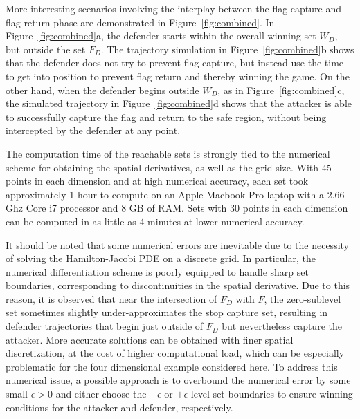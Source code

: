 \documentclass[letterpaper, 10 pt, conference]{ieeeconf}  %
\numberwithin{algorithm}{section}
\begin{document}
More interesting scenarios involving the interplay between the flag capture and flag return phase are demonstrated in Figure~\ref{fig:combined}.  In Figure~\ref{fig:combined}a, the defender starts within the overall winning set $W_D$, but outside the set $F_D$.  The trajectory simulation in Figure~\ref{fig:combined}b shows that the defender does not try to prevent flag capture, but instead use the time to get into position to prevent flag return and thereby winning the game.  On the other hand, when the defender begins outside $W_D$, as in Figure~\ref{fig:combined}c, the simulated trajectory in Figure~\ref{fig:combined}d shows that the attacker is able to successfully capture the flag and return to the safe region, without being intercepted by the defender at any point.  

The computation time of the reachable sets is strongly tied to the numerical scheme for obtaining the spatial derivatives, as well as the grid size.  With 45 points in each dimension and at high numerical accuracy, each set took approximately 1 hour to compute on an Apple Macbook Pro laptop with a 2.66 Ghz Core i7 processor and 8 GB of RAM.  Sets with 30 points in each dimension can be computed in as little as 4 minutes at lower numerical accuracy.  

It should be noted that some numerical errors are inevitable due to the necessity of solving the Hamilton-Jacobi PDE on a discrete grid.  In particular, the numerical differentiation scheme is poorly equipped to handle sharp set boundaries, corresponding to discontinuities in the spatial derivative.  Due to this reason, it is observed that near the intersection of $F_D$ with $F$, the zero-sublevel set sometimes slightly under-approximates the stop capture set, resulting in defender trajectories that begin just outside of $F_D$ but nevertheless capture the attacker.  More accurate solutions can be obtained with finer spatial discretization, at the cost of higher computational load, which can be especially problematic for the four dimensional example considered here.  To address this numerical issue, a possible approach is to overbound the numerical error by some small $\epsilon > 0$ and either choose the $-\epsilon$ or $+\epsilon$ level set boundaries to ensure winning conditions for the attacker and defender, respectively.


\end{document}

